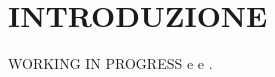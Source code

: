 \chapter*{INTRODUZIONE}
{}
WORKING IN PROGRESS \cite[vedi][]{vpmcm:code} e \cite[vedi][23]{giga:main} e
\cite[vedi][cp 3]{gui:sapiro}.

